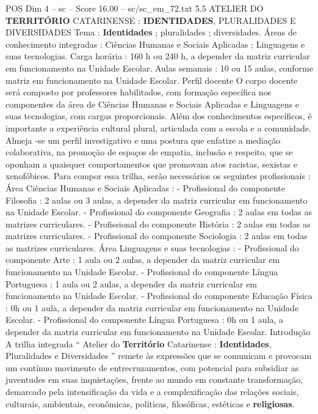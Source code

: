 \begin{textsample}{POS Dim 4 – sc – Score 16.00 – sc/sc\_em\_72.txt}  \label{ex:f4_pos_039}
5.5 ATELIER DO \textbf{TERRITÓRIO} CATARINENSE : \textbf{IDENTIDADES}, PLURALIDADES E DIVERSIDADES Tema : \textbf{Identidades} ; pluralidades ; diversidades.
Áreas de conhecimento integradas : Ciências Humanas e Sociais Aplicadas ; Linguagens e suas tecnologias.
Carga horária : 160 h ou 240 h, a depender da matriz curricular em funcionamento na Unidade Escolar.
Aulas semanais : 10 ou 15 aulas, conforme matriz em funcionamento na Unidade Escolar.
Perfil docente O corpo docente será composto por professores habilitados, com formação específica nos componentes da área de Ciências Humanas e Sociais Aplicadas e Linguagens e suas tecnologias, com cargas proporcionais.
Além dos conhecimentos específicos, é importante a experiência cultural plural, articulada com a escola e a comunidade.
Almeja -se um perfil investigativo e uma postura que enfatize a mediação colaborativa, na promoção de espaços de empatia, inclusão e respeito, que se oponham a quaisquer comportamentos que promovam atos racistas, sexistas e xenofóbicos.
Para compor essa trilha, serão necessários os seguintes profissionais : Área Ciências Humanas e Sociais Aplicadas : - Profissional do componente Filosofia : 2 aulas ou 3 aulas, a depender da matriz curricular em funcionamento na Unidade Escolar. - Profissional do componente Geografia : 2 aulas em todas as matrizes curriculares. - Profissional do componente História : 2 aulas em todas as matrizes curriculares. - Profissional do componente Sociologia : 2 aulas em todas as matrizes curriculares.
Área Linguagens e suas tecnologias : - Profissional do componente Arte : 1 aula ou 2 aulas, a depender da matriz curricular em funcionamento na Unidade Escolar. - Profissional do componente Língua Portuguesa : 1 aula ou 2 aulas, a depender da matriz curricular em funcionamento na Unidade Escolar. - Profissional do componente Educação Física : 0h ou 1 aula, a depender da matriz curricular em funcionamento na Unidade Escolar. - Profissional do componente Língua Portuguesa : 0h ou 1 aula, a depender da matriz curricular em funcionamento na Unidade Escolar.
Introdução A trilha integrada “ Atelier do \textbf{Território} Catarinense : \textbf{Identidades}, Pluralidades e Diversidades ” remete às expressões que se comunicam e provocam um contínuo movimento de entrecruzamentos, com potencial para subsidiar as juventudes em suas inquietações, frente ao mundo em constante transformação, demarcado pela intensificação da vida e a complexificação das relações sociais, culturais, ambientais, econômicas, políticas, filosóficas, estéticas e \textbf{religiosas}.

\end{textsample}
